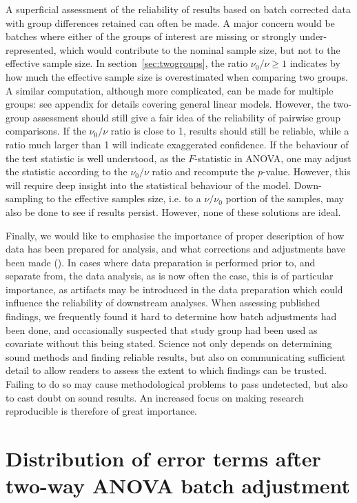 \documentclass{bio}
\begin{document}
A superficial assessment of the reliability of results based on batch corrected data with group differences retained can often be made. A major concern would be batches where either of the groups of interest are missing or strongly under-represented, which would contribute to the nominal sample size, but not to the effective sample size. In section~\ref{sec:twogroups}, the ratio $\nu_0/\nu\ge1$ indicates by how much the effective sample size is overestimated when comparing two groups. A similar computation, although more complicated, can be made for multiple groups: see appendix for details covering general linear models. However, the two-group assessment should still give a fair idea of the reliability of pairwise group comparisons. If the $\nu_0/\nu$ ratio is close to 1, results should still be reliable, while a ratio much larger than 1 will indicate exaggerated confidence. If the behaviour of the test statistic is well understood, as the $F$-statistic in ANOVA, one may adjust the statistic according to the $\nu_0/\nu$ ratio and recompute the $p$-value. However, this will require deep insight into the statistical behaviour of the model. Down-sampling to the effective samples size, i.e. to a $\nu/\nu_0$ portion of the samples, may also be done to see if results persist. However, none of these solutions are ideal.

Finally, we would like to emphasise the importance of proper description of how data has been prepared for analysis, and what corrections and adjustments have been made (\citealp{Sandve2013}). In cases where data preparation is performed prior to, and separate from, the data analysis, as is now often the case, this is of particular importance, as artifacts may be introduced in the data preparation which could influence the reliability of downstream analyses. When assessing published findings, we frequently found it hard to determine how batch adjustments had been done, and occasionally suspected that study group had been used as covariate without this being stated. Science not only depends on determining sound methods and finding reliable results, but also on communicating sufficient detail to allow readers to assess the extent to which findings can be trusted. Failing to do so may cause methodological problems to pass undetected, but also to cast doubt on sound results. An increased focus on making research reproducible is therefore of great importance.



\appendix
\section{Distribution of error terms after two-way ANOVA batch adjustment}
\label{sec:chiApprox}
\end{document}
